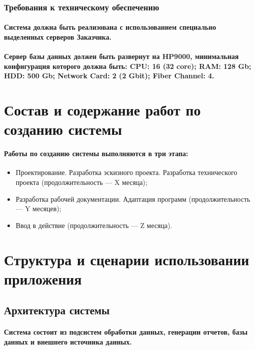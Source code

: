 \documentclass{article}
\begin{document}
        \subsubsection{Требования к техническому обеспечению}
            \paragraph{Система должна быть реализована с использованием специально выделенных серверов Заказчика.}
            \paragraph{Сервер базы данных должен быть развернут на HP9000, минимальная конфигурация которого должна быть: CPU: 16 (32 core); RAM: 128 Gb; HDD: 500 Gb; Network Card: 2 (2 Gbit); Fiber Channel: 4.}
            
\section{Состав и содержание работ по созданию системы}
    \paragraph{Работы по созданию системы выполняются в три этапа:}
    \begin{itemize}
        \item Проектирование. Разработка эскизного проекта. Разработка технического проекта (продолжительность — X месяца);
        \item Разработка рабочей документации. Адаптация программ (продолжительность — Y месяцев);
        \item Ввод в действие (продолжительность — Z месяца).
    \end{itemize}
    
\section{Структура и сценарии использовании приложения}
    \subsection{Архитектура системы}
        \paragraph{Система состоит из подсистем обработки данных, генерации отчетов, базы данных и внешнего источника данных.}
    
\end{document}
